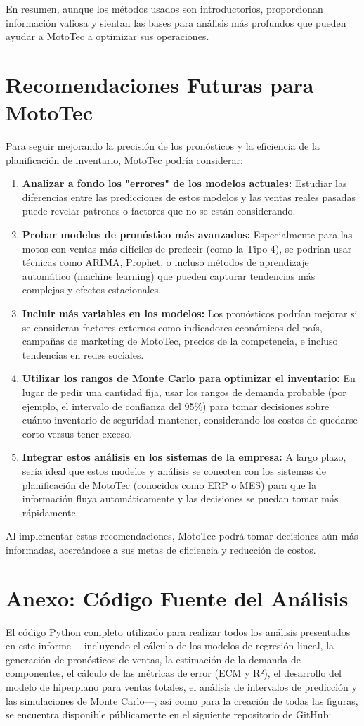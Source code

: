 \documentclass[12pt,a4paper]{article}
\begin{document}
En resumen, aunque los métodos usados son introductorios, proporcionan información valiosa y sientan las bases para análisis más profundos que pueden ayudar a MotoTec a optimizar sus operaciones.

\section{Recomendaciones Futuras para MotoTec}
Para seguir mejorando la precisión de los pronósticos y la eficiencia de la planificación de inventario, MotoTec podría considerar:
\begin{enumerate}
    \item \textbf{Analizar a fondo los "errores" de los modelos actuales:} Estudiar las diferencias entre las predicciones de estos modelos y las ventas reales pasadas puede revelar patrones o factores que no se están considerando.
    \item \textbf{Probar modelos de pronóstico más avanzados:} Especialmente para las motos con ventas más difíciles de predecir (como la Tipo 4), se podrían usar técnicas como ARIMA, Prophet, o incluso métodos de aprendizaje automático (machine learning) que pueden capturar tendencias más complejas y efectos estacionales.
    \item \textbf{Incluir más variables en los modelos:} Los pronósticos podrían mejorar si se consideran factores externos como indicadores económicos del país, campañas de marketing de MotoTec, precios de la competencia, e incluso tendencias en redes sociales.
    \item \textbf{Utilizar los rangos de Monte Carlo para optimizar el inventario:} En lugar de pedir una cantidad fija, usar los rangos de demanda probable (por ejemplo, el intervalo de confianza del 95\%) para tomar decisiones sobre cuánto inventario de seguridad mantener, considerando los costos de quedarse corto versus tener exceso.
    \item \textbf{Integrar estos análisis en los sistemas de la empresa:} A largo plazo, sería ideal que estos modelos y análisis se conecten con los sistemas de planificación de MotoTec (conocidos como ERP o MES) para que la información fluya automáticamente y las decisiones se puedan tomar más rápidamente.
\end{enumerate}
Al implementar estas recomendaciones, MotoTec podrá tomar decisiones aún más informadas, acercándose a sus metas de eficiencia y reducción de costos.

\newpage
\section*{Anexo: Código Fuente del Análisis}
El código Python completo utilizado para realizar todos los análisis presentados en este informe —incluyendo el cálculo de los modelos de regresión lineal, la generación de pronósticos de ventas, la estimación de la demanda de componentes, el cálculo de las métricas de error (ECM y R²), el desarrollo del modelo de hiperplano para ventas totales, el análisis de intervalos de predicción y las simulaciones de Monte Carlo—, así como para la creación de todas las figuras, se encuentra disponible públicamente en el siguiente repositorio de GitHub:
\end{document}
